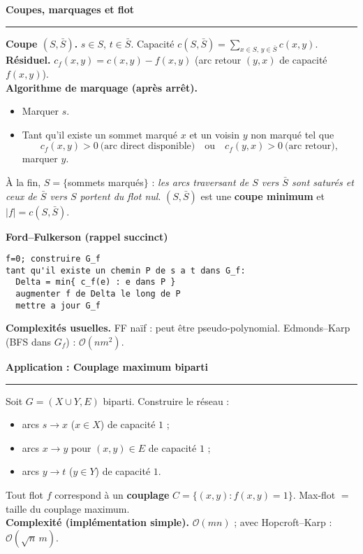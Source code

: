 \documentclass[9pt,a4paper]{article}
\newcommand{\bigO}{\mathcal{O}}
\newcommand{\sect}[1]{\vspace{1ex}\textbf{\large #1}\par\vspace{0.3ex}\hrule\vspace{0.6ex}}
\newcommand{\subsect}[1]{\vspace{0.4ex}\textbf{#1}\par}
\begin{document}
\newpage
\begin{multicols}{3}
    \sloppy\raggedcolumns
    \scriptsize

    \sect{Coupes, marquages et flot}
    \textbf{Coupe $(S,\bar S)$.} $s\in S$, $t\in\bar S$. Capacité $c(S,\bar S)=\sum_{x\in S,\,y\in\bar S}c(x,y)$. \\
    \textbf{Résiduel.} $c_f(x,y)=c(x,y)-f(x,y)$ (arc retour $(y,x)$ de capacité $f(x,y)$). \\
    \textbf{Algorithme de marquage (après arrêt).}
    \begin{itemize}
        \item Marquer $s$.
        \item Tant qu'il existe un sommet marqué $x$ et un voisin $y$ non marqué tel que
              \[
                  c_f(x,y)>0 \ \text{(arc direct disponible)} \quad\text{ou}\quad c_f(y,x)>0 \ \text{(arc retour)} ,
              \]
              marquer $y$.
    \end{itemize}
    À la fin, $S=\{$sommets marqués$\}$ : \emph{les arcs traversant de $S$ vers $\bar S$ sont saturés et ceux de $\bar S$ vers $S$ portent du flot nul}. $(S,\bar S)$ est une \textbf{coupe minimum} et $|f|=c(S,\bar S)$.

    \subsect{Ford--Fulkerson (rappel succinct)}
    \begin{lstlisting}[style=tight]
f=0; construire G_f
tant qu'il existe un chemin P de s a t dans G_f:
  Delta = min{ c_f(e) : e dans P }
  augmenter f de Delta le long de P
  mettre a jour G_f
\end{lstlisting}
    \textbf{Complexités usuelles.} FF naïf : peut être pseudo-polynomial. Edmonds--Karp (BFS dans $G_f$) : $\bigO(nm^2)$.

    \sect{Application : Couplage maximum biparti}
    Soit $G=(X\cup Y,E)$ biparti. Construire le réseau :
    \begin{itemize}
        \item arcs $s\to x$ ($x\in X$) de capacité $1$ ;
        \item arcs $x\to y$ pour $(x,y)\in E$ de capacité $1$ ;
        \item arcs $y\to t$ ($y\in Y$) de capacité $1$.
    \end{itemize}
    Tout flot $f$ correspond à un \textbf{couplage} $C=\{(x,y): f(x,y)=1\}$.
    Max-flot $=$ taille du couplage maximum. \\
    \textbf{Complexité (implémentation simple).} $\bigO(mn)$ ; avec Hopcroft--Karp : $\bigO(\sqrt{n}\,m)$.


\end{multicols}
\end{document}
